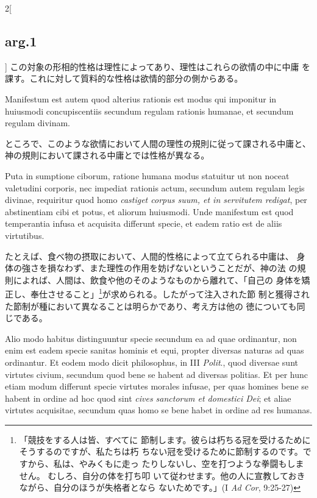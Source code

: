 \documentclass[paper=a4paper,fontsize=10pt,jafontsize=9pt,titlepage]{jlreq}
\begin{document}
\begin{paracol}{2}[\subsection{arg.1}]
この対象の形相的性格は理性によってあり、理性はこれらの欲情の中に中庸
 を課す。これに対して質料的な性格は欲情的部分の側からある。

\switchcolumn*

Manifestum est autem quod alterius rationis est
modus qui imponitur in huiusmodi concupiscentiis secundum regulam
rationis humanae, et secundum regulam divinam.

\switchcolumn

ところで、このような欲情において人間の理性の規則に従って課される中庸と、
神の規則において課される中庸とでは性格が異なる。

\switchcolumn*

Puta in sumptione ciborum, ratione humana modus statuitur ut non
noceat valetudini corporis, nec impediat rationis actum, secundum
autem regulam legis divinae, requiritur quod homo {\itshape castiget corpus
suum, et in servitutem redigat}, per abstinentiam cibi et potus, et
aliorum huiusmodi. Unde manifestum est quod temperantia infusa et
acquisita differunt specie, et eadem ratio est de aliis virtutibus.

\switchcolumn

たとえば、食べ物の摂取において、人間的性格によって立てられる中庸は、
 身体の強さを損なわず、また理性の作用を妨げないということだが、神の法
 の規則によれば、人間は、飲食や他のそのようなものから離れて、「自己の
 身体を矯正し、奉仕させること」\footnote{「競技をする人は皆、すべてに
 節制します。彼らは朽ちる冠を受けるためにそうするのですが、私たちは朽
 ちない冠を受けるために節制するのです。ですから、私は、やみくもに走っ
 たりしないし、空を打つような拳闘もしません。 むしろ、自分の体を打ち叩
 いて従わせます。他の人に宣教しておきながら、自分のほうが失格者となら
 ないためです。」(I {\itshape Ad Cor}, 9:25-27)}が求められる。したがって注入された節
 制と獲得された節制が種において異なることは明らかであり、考え方は他の
 徳についても同じである。

\switchcolumn*

Alio modo habitus distinguuntur specie secundum ea ad quae ordinantur,
non enim est eadem specie sanitas hominis et equi, propter diversas
naturas ad quas ordinantur. Et eodem modo dicit philosophus, in III
{\itshape Polit}., quod diversae sunt virtutes civium, secundum quod
bene se habent ad diversas politias. Et per hunc etiam modum differunt
specie virtutes morales infusae, per quas homines bene se habent in
ordine ad hoc quod sint {\itshape cives sanctorum et domestici Dei};
et aliae virtutes acquisitae, secundum quas homo se bene habet in
ordine ad res humanas.


\end{paracol}
\end{document}

